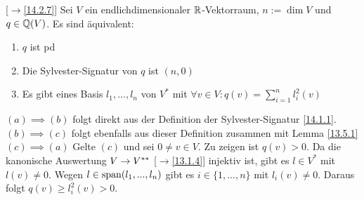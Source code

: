 \documentclass[../../main.tex]{subfiles}
\begin{document}
\begin{sat}\mbox{}[$\to$\ref{14.2.7}]
\label{14.2.12}
Sei $V$ ein endlichdimensionaler $\mathbb R$-Vektorraum, $n:=\dim V$ und $q\in \mathbb Q(V)$. Es sind äquivalent:
\begin{enumerate}[\normalfont(a)]
\item $q$ ist pd
\item Die Sylvester-Signatur von $q$ ist $(n,0)$
\item Es gibt eines Basis $l_1,...,l_n$ von $V^*$ mit $\forall v\in V: q(v)=\sum_{i=1}^n l_i^2(v)$
\end{enumerate}
\end{sat}
\begin{cproof}
\underline{$(a)\implies (b)$} folgt direkt aus der Definition der Sylvester-Signatur \ref{14.1.1}.\\

\noindent\underline{$(b)\implies (c)$} folgt ebenfalls aus dieser Definition zusammen mit Lemma \ref{13.5.1}\\

\noindent \underline{$(c)\implies (a)$} Gelte $(c)$ und sei $0\neq v\in V$. Zu zeigen ist $q(v)>0$. Da die kanonische Auswertung $V\to V^{**}$ [$\to$\ref{13.1.4}] injektiv ist, gibt es $l\in V^*$ mit $l(v)\neq 0$. Wegen $l\in\operatorname{span}(l_1,...,l_n)$ gibt es $i\in\{1,...,n\}$ mit $l_i(v)\neq 0$. Daraus folgt $q(v)\ge l_i^2(v)>0$.
\end{cproof}
\end{document}
